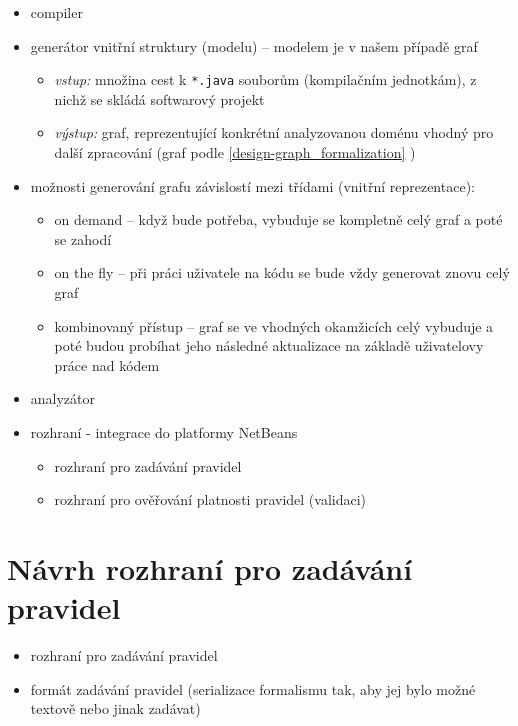 \begin{itemize}
\item compiler
\item generátor vnitřní struktury (modelu) -- modelem je v našem případě graf
  \begin{itemize}
  \item \emph{vstup:} množina cest k \verb+*.java+ souborům (kompilačním jednotkám), z nichž se skládá softwarový projekt
  \item \emph{výstup:} graf, reprezentující konkrétní analyzovanou doménu vhodný pro další zpracování (graf podle \ref{design-graph_formalization} )
  \end{itemize}
\item možnosti generování grafu závislostí mezi třídami (vnitřní reprezentace):
  \begin{itemize}
  \item on demand -- když bude potřeba, vybuduje se kompletně celý graf a poté se zahodí
  \item on the fly -- při práci uživatele na kódu se bude vždy generovat znovu celý graf
  \item kombinovaný přístup -- graf se ve vhodných okamžicích celý vybuduje a poté budou probíhat jeho následné aktualizace na základě uživatelovy práce nad kódem
  \end{itemize}
\item analyzátor
\item rozhraní - integrace do platformy NetBeans
  \begin{itemize}
  \item rozhraní pro zadávání pravidel
  \item rozhraní pro ověřování platnosti pravidel (validaci)
  \end{itemize}
\end{itemize}


\section{Návrh rozhraní pro zadávání pravidel}
\begin{itemize}
\item rozhraní pro zadávání pravidel
\item formát zadávání pravidel (serializace formalismu tak, aby jej bylo možné textově nebo jinak zadávat)
\end{itemize}

